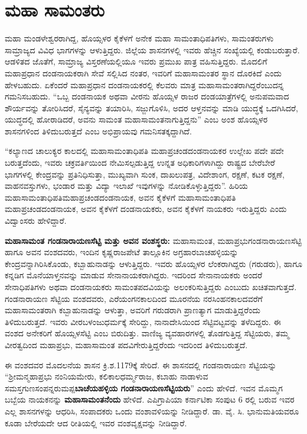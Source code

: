 \section{ಮಹಾ ಸಾಮಂತರು}

ಮಹಾ ಮಂಡಳೇಶ್ವರರಾಗಿದ್ದ, ಹೊಯ್ಸಳರ ಕೈಕೆಳಗೆ ಅನೇಕ ಮಹಾ ಸಾಮಂತಾಧಿಪತಿಗಳು, ಸಾಮಂತರುಗಳು ಸಾಮ್ರಾಜ್ಯದ ವಿವಿಧ ಭಾಗಗಳನ್ನು ಆಳುತ್ತಿದ್ದರು. ಜಿಲ್ಲೆಯ ಶಾಸನಗಳಲ್ಲಿ ಇವರು ಹೆಚ್ಚಿನ ಸಂಖ್ಯೆಯಲ್ಲಿ ಕಂಡುಬರುತ್ತಾರೆ. ಆಡಳಿತದ ಜೊತೆಗೆ, ಸಾಮ್ರಾಜ್ಯ ವಿಸ್ತರಣೆಯಲ್ಲಿಯೂ ಇವರು ಪ್ರಮುಖ ಪಾತ್ರ ವಹಿಸುತ್ತಿದ್ದರು. ಮೊದಲಿಗೆ ಮಹಾಪ್ರಧಾನ ದಂಡನಾಯಕರಾಗಿ ಸೇವೆ ಸಲ್ಲಿಸಿದ ನಂತರ, ಇವರಿಗೆ ಮಹಾಸಾಮಂತರ ಸ್ಥಾನ ದೊರಕಿದೆ ಎಂದು ಹೇಳಬಹುದು. ಏಕೆಂದರೆ ಮಹಾಪ್ರಧಾನ ದಂಡನಾಯಕರಲ್ಲಿ ಕೆಲವರು ಮಾತ್ರ ಮಹಾಸಾಮಂತರಾಗಿದ್ದರೆಂಬುದನ್ನ ಗಮನಿಸಬಹುದು. “ಒಬ್ಬ ದಂಡನಾಯಕ ಅಥವಾ ವೀರನು ಹೊಯ್ಸಳ ರಾಜರ ದಂಡಯಾತ್ರೆಗಳಲ್ಲಿ ಅನುಪಮವಾದ ಶೌರ್ಯವನ್ನು ತೋರಿಸಿದರೆ, ಸೈನ್ಯವನ್ನು ತಯಾರಿಸಿ, ಸಜ್ಜುಗೊಳಿಸಿ, ಅದರ ಆಳ್ತನವನ್ನು ಮಾಡಿ ಯುದ್ಧಕ್ಕೆ ಒದಗಿಸಿದರೆ, ಯುದ್ಧದಲ್ಲಿ ಹೋರಾಡಿದರೆ, ಅವನು ಸಾಮಂತ ಮಹಾಸಾಮಂತನಾಗುತ್ತಿದ್ದನು” ಎಂಬ ಅಂಶ ಹೊಯ್ಸಳರ ಶಾಸನಗಳಿಂದ ತಿಳಿದುಬರುತ್ತದೆ ಎಂಬ ಅಭಿಪ್ರಾಯವು ಗಮನಿಸತಕ್ಕದ್ದಾಗಿದೆ.

“ಕಲ್ಯಾಣದ ಚಾಲುಕ್ಯರ ಕಾಲದಲ್ಲಿ ಮಹಾಸಾಮಂತಾಧಿಪತಿ ಮಹಾಪ್ರಚಂಡದಂಡನಾಯಕರ ಉಲ್ಲೇಖ ಪದೇ ಪದೇ ಬರುತ್ತದೆಂದು, ಇವರು ಚಕ್ರವರ್ತಿಯಿಂದ ನೇಮಿಸಲ್ಪಡುತ್ತಿದ್ದ ಉನ್ನತ ಅಧಿಕಾರಿಗಳಾಗಿದ್ದು ರಾಷ್ಟ್ರದ ಬೇರೆಬೇರೆ ಭಾಗಗಳಲ್ಲಿ ಕೇಂದ್ರವನ್ನು ಪ್ರತಿನಿಧಿಸುತ್ತಾ, ಮುಖ್ಯವಾಗಿ ಸುಂಕ, ದಾಖಲುಪತ್ರ, ವಿದೇಶಾಂಗ, ರಕ್ಷಣೆ, ಕಟಕ ರಕ್ಷಣೆ, ವಾಹನವಸ್ತುಗಳು, ಭಂಡಾರ ಮತ್ತು ವಿದ್ಯಾ ಇಲಾಖೆ ಇವುಗಳನ್ನು ನೋಡಿಕೊಳ್ಳುತ್ತಿದ್ದರು”. ಹಿರಿಯ ಮಹಾಸಾಮಂತಾಧಿಪತಿ\break ಮಹಾಪ್ರಚಂಡದಂಡನಾಯಕ, ಅವನ ಕೈಕೆಳಗೆ ಮಹಾಸಾಮಂತಾಧಿಪತಿ ಮಹಾಪ್ರಚಂಡದಂಡನಾಯಕ, ಅವನ ಕೈಕೆಳಗೆ ದಂಡನಾಯಕರು, ಅವನ ಕೈಕೆಳಗೆ ನಾಯಕರು ಇರುತ್ತಿದ್ದರು ಎಂದು ವಿದ್ವಾಂಸರು ಹೇಳಿದ್ದಾರೆ.

\textbf{ಮಹಾಸಾಮಂತ ಗಂಡನಾರಾಯಣಸೆಟ್ಟಿ ಮತ್ತು ಅವನ ವಂಶಸ್ಥರು:} ಮಹಾಸಾಮಂತ, ಮಹಾಪ್ರಭು\break ಗಂಡನಾರಾಯಣಸೆಟ್ಟಿ ಹಾಗೂ ಅವನ ವಂಶದವರು, ಇಂದಿನ ಕೃಷ್ಣರಾಜಪೇಟೆ ತಾಲ್ಲೂಕಿನ ಅಗ್ರಹಾರಬಾಚಹಳ್ಳಿಯನ್ನು ಕೇಂದ್ರವನ್ನಾಗಿರಿಸಿಕೊಂಡು, ಕಬ್ಬಾಹುನಾಡನ್ನು ಆಳುತ್ತಿದ್ದರು. ಇವರು ಹೊಯ್ಸಳರ ಲೆಂಕರಾಗಿದ್ದರು (ಗರುಡರು), ಹಾಗೂ ಕನ್ನಡಿಗ ಮೊನೆಯಾಳ್ತನವನ್ನು ಮಾಡುವ ಸೇನಾನಾಯಕರಾಗಿದ್ದರು. ಇದರಿಂದ ಸೇನಾನಾಯಕರು ಅಂದರೆ ಸೇನಾಧಿಪತಿಗಳು ಅಥವಾ ದಂಡನಾಯಕರು ಸಾಮಂತಪದವಿಯನ್ನು ಅಲಂಕರಿಸುತ್ತಿದ್ದರು ಎಂಬುದು ಖಚಿತವಾಗುತ್ತದೆ. ಗಂಡನಾರಾಯಣ ಸೆಟ್ಟಿಯ ವಂಶದವರು, ಎರೆಯಂಗನಕಾಲದಿಂದ ಮೂರನೆಯ ನರಸಿಂಹನಕಾಲದವರೆಗೆ ಮಹಾಸಾಮಂತರಾಗಿ ಕಬ್ಬಾಹುನಾಡನ್ನು ಆಳುತ್ತಾ, ಅವರಿಗೆ ಗರುಡರಾಗಿ ಪ್ರಾಣತ್ಯಾಗ ಮಾಡುತ್ತಿದ್ದರೆಂದು ತಿಳಿದುಬರುತ್ತದೆ. ಇವರು ವೀರಬಳಂಜುಧರ್ಮಕ್ಕೆ ಸೇರಿದ್ದು, ನಾನಾದೇಸಿಯಿಂದ ಸೆಟ್ಟಿವಟ್ಟವನ್ನು ತಳೆದಿದ್ದರು. ಈ ವಂಶದ ಅನೇಕರಿಗೆ ಹೊಯ್ಸಳಸೆಟ್ಟಿ ಎಂಬ ಬಿರುದಿತ್ತು. ವಾಣಿಜ್ಯ ವ್ಯವಹಾರಗಳಲ್ಲಿ ತೊಡಗುತ್ತಿದ್ದ ಸೆಟ್ಟಿಯರು, ತಮ್ಮ ವೀರತ್ವದಿಂದ ಮಹಾಪ್ರಭು, ಮಹಾಸಾಮಂತ ಪದವಿಗೇರುತ್ತಿದ್ದರೆಂದು ಇದರಿಂದ ತಿಳಿದುಬರುತ್ತದೆ.

ಈ ವಂಶದವರ ಮೊದಲನೆಯ ಶಾಸನ ಕ್ರಿ.ಶ.1179ಕ್ಕೆ ಸೇರಿದೆ. ಈ ಶಾಸನದಲ್ಲಿ ಗಂಡನಾರಾಯಣ ಸೆಟ್ಟಿಯನ್ನು “ಶ‍್ರೀಮನ್ಮಹಾಪ್ರಭು ನಂನಿಯಮೇರು, ಕಲಿಕಾಲಧರ್ಮ್ಮರಾಜ, ಕಬಾಹು ನಾಡಾಳುವ ಸಮಸ್ತಗುಣಸಂಪನ್ನರುಮಪ್ಪ\break \textbf{ಬಾಚೆಯಹಳ್ಳಿಯ ಗಂಡನಾರಾಯಣಸೆಟ್ಟಿಯರು}” ಎಂದು ಹೇಳಿದೆ. ಇವನ ಮೊಮ್ಮಗ ಬಬ್ಬೆಯ ನಾಯಕನನ್ನು \textbf{ಮಹಾಸಾಮಂತ\-ನೆಂದು} ಹೇಳಿದೆ. ಎಪಿಗ್ರಾಪಿಯಾ ಕರ್ನಾಟಿಕಾ ಸಂಪುಟ 6 ರಲ್ಲಿ ಬರುವ ಇವರ ಎಲ್ಲ ಶಾಸನಗಳನ್ನು ಆಧರಿಸಿ, ಸಂಪಾದಕರು ಒಂದು ವಂಶಾವಳಿಯನ್ನು ನೀಡಿದ್ದಾರೆ. ಡಾ. ವೈ. ಸಿ. ಭಾನುಮತಿಯವರೂ ಕೂಡಾ ಬೇರೆಯದೇ ಆದ ರೀತಿಯಲ್ಲಿ ಇವರ ವಂಶವೃಕ್ಷವನ್ನು ನೀಡಿದ್ದಾರೆ.

